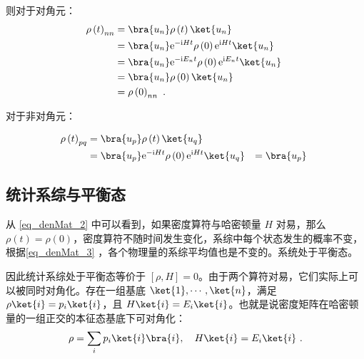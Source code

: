 则对于对角元：
\begin{equation}
\begin{aligned}
\rho\left( t \right)_{nn} &= \bra{u_n}\rho\left( t \right)\ket{u_n}\\
&= \bra{u_n}\mathrm{e}^{-\mathrm{i}H t}\rho\left( 0 \right)\mathrm{e}^{\mathrm{i}Ht}\ket{u_n} \\
&=\bra{u_n}\mathrm{e}^{-\mathrm{i}E_n t}\rho\left( 0 \right)\mathrm{e}^{\mathrm{i}E_nt}\ket{u_n} \\
&=\bra{u_n}\rho\left( 0 \right)\ket{u_n} \\
&=\rho\left( 0 \right)_{nn}~.
\end{aligned}~
\end{equation}

对于非对角元：

\begin{equation}
\begin{aligned}
\rho \left( t \right)_{pq} &= \bra{u_p}\rho\left(t\right)\ket{u_q} \\
&= \bra{u_p}\mathrm{e}^{-\mathrm{i}Ht}\rho\left(0\right)\mathrm{e}^{\mathrm{i}Ht}\ket{u_q}
&= \bra{u_p}
\end{aligned}~
\end{equation}








\subsection{统计系综与平衡态}
从 \autoref{eq_denMat_2} 中可以看到，如果密度算符与哈密顿量 $H$ 对易，那么 $\rho(t)=\rho(0)$，密度算符不随时间发生变化，系综中每个状态发生的概率不变，根据\autoref{eq_denMat_3} ，各个物理量的系综平均值也是不变的。系统处于平衡态。

因此统计系综处于平衡态等价于 $[\rho,H]=0$。由于两个算符对易，它们实际上可以被同时对角化。存在一组基底 $\ket{1},\cdots,\ket{n}$，满足 $\rho \ket{i} = p_i \ket{i}$，且 $H\ket{i}=E_i \ket{i}$。也就是说密度矩阵在哈密顿量的一组正交的本征态基底下可对角化：
\begin{equation}
\rho = \sum_i p_i \ket{i}\bra{i},\quad H\ket{i}=E_i \ket{i}~.
\end{equation}

